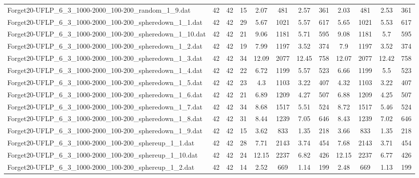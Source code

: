 \begin{sidewaystable}[!ht]
{\begin{tabular}{lccccccccccc}
Forget20-UFLP\_6\_3\_1000-2000\_100-200\_random\_1\_9.dat & 42 & 42 & 15 & 2.07 & 481 & 2.57 & 361 &  \textcolor{blue2}{2.03} & 481 & 2.53 & 361 \\
Forget20-UFLP\_6\_3\_1000-2000\_100-200\_spheredown\_1\_1.dat & 42 & 42 & 29 & 5.67 & 1021 & 5.57 & 617 & 5.65 & 1021 &  \textcolor{blue2}{5.53} & 617 \\
Forget20-UFLP\_6\_3\_1000-2000\_100-200\_spheredown\_1\_10.dat & 42 & 42 & 21 & 9.06 & 1181 & 5.71 & 595 & 9.08 & 1181 &  \textcolor{blue2}{5.7} & 595 \\
Forget20-UFLP\_6\_3\_1000-2000\_100-200\_spheredown\_1\_2.dat & 42 & 42 & 19 & 7.99 & 1197 &  \textcolor{blue2}{3.52} & 374 & 7.9 & 1197 &  \textcolor{blue2}{3.52} & 374 \\
Forget20-UFLP\_6\_3\_1000-2000\_100-200\_spheredown\_1\_3.dat & 42 & 42 & 34 & 12.09 & 2077 & 12.45 & 758 & 12.07 & 2077 & 12.42 & 758 \\
Forget20-UFLP\_6\_3\_1000-2000\_100-200\_spheredown\_1\_4.dat & 42 & 42 & 22 & 6.72 & 1199 & 5.57 & 523 & 6.66 & 1199 &  \textcolor{blue2}{5.5} & 523 \\
Forget20-UFLP\_6\_3\_1000-2000\_100-200\_spheredown\_1\_5.dat & 42 & 42 & 23 & 4.3 & 1103 &  \textcolor{blue2}{3.22} & 407 & 4.32 & 1103 &  \textcolor{blue2}{3.22} & 407 \\
Forget20-UFLP\_6\_3\_1000-2000\_100-200\_spheredown\_1\_6.dat & 42 & 42 & 21 & 6.89 & 1209 & 4.27 & 507 & 6.88 & 1209 &  \textcolor{blue2}{4.25} & 507 \\
Forget20-UFLP\_6\_3\_1000-2000\_100-200\_spheredown\_1\_7.dat & 42 & 42 & 34 & 8.68 & 1517 & 5.51 & 524 & 8.72 & 1517 & 5.46 & 524 \\
Forget20-UFLP\_6\_3\_1000-2000\_100-200\_spheredown\_1\_8.dat & 42 & 42 & 31 & 8.44 & 1239 & 7.05 & 646 & 8.43 & 1239 & 7.02 & 646 \\
Forget20-UFLP\_6\_3\_1000-2000\_100-200\_spheredown\_1\_9.dat & 42 & 42 & 15 & 3.62 & 833 &  \textcolor{blue2}{1.35} & 218 & 3.66 & 833 &  \textcolor{blue2}{1.35} & 218 \\
Forget20-UFLP\_6\_3\_1000-2000\_100-200\_sphereup\_1\_1.dat & 42 & 42 & 28 & 7.71 & 2143 & 3.74 & 454 & 7.68 & 2143 &  \textcolor{blue2}{3.71} & 454 \\
Forget20-UFLP\_6\_3\_1000-2000\_100-200\_sphereup\_1\_10.dat & 42 & 42 & 24 & 12.15 & 2237 & 6.82 & 426 & 12.15 & 2237 &  \textcolor{blue2}{6.77} & 426 \\
Forget20-UFLP\_6\_3\_1000-2000\_100-200\_sphereup\_1\_2.dat & 42 & 42 & 14 & 2.52 & 669 & 1.14 & 199 & 2.48 & 669 &  \textcolor{blue2}{1.13} & 199 \\

\end{tabular}}
\end{sidewaystable}
